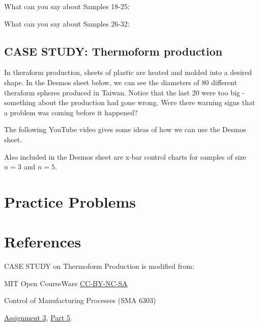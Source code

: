 \documentclass{ximera}
\begin{document}
\begin{problem}
What can you say about Samples  18-25:
\begin{multipleChoice}
\end{multipleChoice}

What can you say about Samples  26-32:
\begin{multipleChoice}
\end{multipleChoice}
\end{problem}

\subsection*{CASE STUDY: Thermoform production}

In theraform production, sheets of plastic are heated and molded into a desired shape.  In the Desmos sheet below, we can see the diameters of 80 different theraform spheres produced in Taiwan.  Notice that the last 20 were too big - something about the production had gone wrong.  Were there warning signs that a problem was coming before it happened?


The following YouTube video gives some ideas of how we can use the Desmos sheet.


Also included in the Desmos sheet are x-bar control charts for samples of size $n=3$ and $n=5$.  


\section*{Practice Problems}

\section*{References}
CASE STUDY on Thermoform Production is modified from:

MIT Open CourseWare \href{https://creativecommons.org/licenses/by-nc-sa/4.0/}{CC-BY-NC-SA}

Control of Manufacturing Processes (SMA 6303)

\href{https://ocw.mit.edu/courses/2-830j-control-of-manufacturing-processes-sma-6303-spring-2008/resources/ps3/}{Assignment 3}, \href{https://ocw.mit.edu/courses/2-830j-control-of-manufacturing-processes-sma-6303-spring-2008/resources/35/}{Part 5}. 
\end{document}
